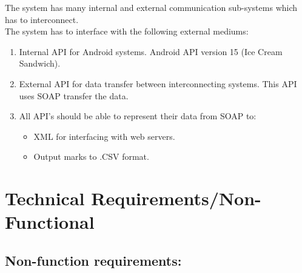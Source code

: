 \documentclass[12pt]{article}
\begin{document}
	The system has many internal and external communication	sub-systems which has to interconnect. 
	\\
	The system has to interface with the following external mediums:
	\begin{enumerate}
	\item Internal API for Android systems. Android API version 15 (Ice Cream Sandwich). 
	\item External API for data transfer between interconnecting systems. This API uses SOAP transfer the data.
	\item All API's should be able to represent their data from SOAP to:
				\begin{itemize}
					\item XML for interfacing with web servers.
					\item Output marks to .CSV format.					
				\end{itemize} 
	\end{enumerate}
	
	\vspace{0.5in}
	
	\section{Technical Requirements/Non-Functional}
	\vspace{0.2in}
	
		\subsection{Non-function requirements:}%
		\vspace{0.1in}
		
\end{document}
